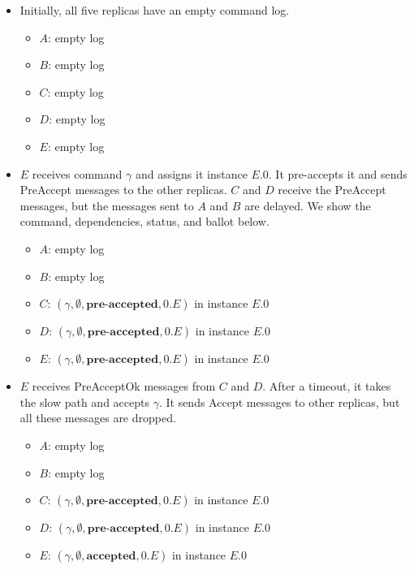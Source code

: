 \documentclass{mwhittaker}
\begin{document}
\newcommand{\preaccepted}{\textbf{pre-accepted}}
\newcommand{\accepted}{\textbf{accepted}}
\newcommand{\committed}{\textbf{committed}}
\begin{itemize}
  \item
    Initially, all five replicas have an empty command log.
    \begin{itemize}
      \item $A$: empty \cmd{} log
      \item $B$: empty \cmd{} log
      \item $C$: empty \cmd{} log
      \item $D$: empty \cmd{} log
      \item $E$: empty \cmd{} log
    \end{itemize}

  \item
    $E$ receives command $\gamma$ and assigns it instance $E.0$. It pre-accepts
    it and sends PreAccept messages to the other replicas. $C$ and $D$ receive
    the PreAccept messages, but the messages sent to $A$ and $B$ are delayed.
    We show the command, dependencies, status, and ballot below.
    \begin{itemize}
      \item $A$: empty \cmd{} log
      \item $B$: empty \cmd{} log
      \item $C$: $(\gamma, \emptyset{}, \preaccepted{}, 0.E)$ in instance $E.0$
      \item $D$: $(\gamma, \emptyset{}, \preaccepted{}, 0.E)$ in instance $E.0$
      \item $E$: $(\gamma, \emptyset{}, \preaccepted{}, 0.E)$ in instance $E.0$
    \end{itemize}

  \item
    $E$ receives PreAcceptOk messages from $C$ and $D$. After a timeout, it
    takes the slow path and accepts $\gamma$. It sends Accept messages to other
    replicas, but all these messages are dropped.
    \begin{itemize}
      \item $A$: empty \cmd{} log
      \item $B$: empty \cmd{} log
      \item $C$: $(\gamma, \emptyset{}, \preaccepted{}, 0.E)$ in instance $E.0$
      \item $D$: $(\gamma, \emptyset{}, \preaccepted{}, 0.E)$ in instance $E.0$
      \item $E$: $(\gamma, \emptyset{}, \accepted{}, 0.E)$ in instance $E.0$
    \end{itemize}


\end{itemize}
\end{document}
